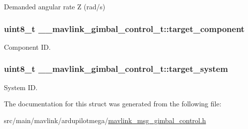 Demanded angular rate Z (rad/s) 

\hypertarget{struct____mavlink__gimbal__control__t_ae37c6ad909d441342df0a961c6a84d51}{
\subsubsection[{target\+\_\+component}]{\setlength{\rightskip}{0pt plus 5cm}uint8\+\_\+t \+\_\+\+\_\+mavlink\+\_\+gimbal\+\_\+control\+\_\+t\+::target\+\_\+component}}\label{struct____mavlink__gimbal__control__t_ae37c6ad909d441342df0a961c6a84d51}


Component I\+D. 

\hypertarget{struct____mavlink__gimbal__control__t_a0c1e50b21e6492eb1549a78e372c0396}{
\subsubsection[{target\+\_\+system}]{\setlength{\rightskip}{0pt plus 5cm}uint8\+\_\+t \+\_\+\+\_\+mavlink\+\_\+gimbal\+\_\+control\+\_\+t\+::target\+\_\+system}}\label{struct____mavlink__gimbal__control__t_a0c1e50b21e6492eb1549a78e372c0396}


System I\+D. 



The documentation for this struct was generated from the following file\+:\begin{DoxyCompactItemize}
\item 
src/main/mavlink/ardupilotmega/\hyperlink{mavlink__msg__gimbal__control_8h}{mavlink\+\_\+msg\+\_\+gimbal\+\_\+control.\+h}\end{DoxyCompactItemize}
